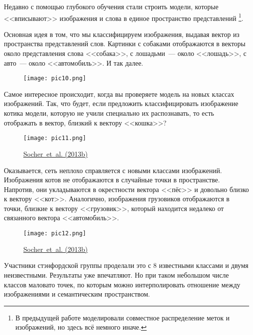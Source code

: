 \documentclass[a4paper,12pt]{article}
\begin{document}
Недавно с помощью глубокого обучения стали строить модели, которые <<вписывают>> изображения и слова в единое пространство представлений \footnote{В предыдущей работе моделировали совместное распределение меток и изображений, но    здесь всё немного иначе.}.

Основная идея в том, что мы классифицируем изображения, выдавая вектор из пространства представлений слов. Картинки с собаками отображаются в векторы около представления слова <<собака>>, с лошадьми~--- около <<лошадь>>, с авто~--- около <<автомобиль>>. И так далее.

\begin{figure}[t]
\begin{center}
\texttt{[image: pic10.png]}
\end{center}
\end{figure}

Самое интересное происходит, когда вы проверяете модель на новых классах изображений. Так, что будет, если предложить классифицировать изображение котика модели, которую не учили специально их распознавать, то есть отображать в вектор, близкий к вектору <<кошка>>?


\begin{figure}[t]
\begin{center}
\texttt{[image: pic11.png]}
\caption{\href{http://nlp.stanford.edu/~socherr/SocherGanjooManningNg_NIPS2013.pdf}{Socher~et~al. (2013b)}}
\end{center}
\end{figure}

Оказывается, сеть неплохо справляется с новыми классами изображений. Изображения котов не отображаются в случайные точки в пространстве. Напротив, они укладываются в окрестности вектора <<пёс>> и довольно близко к вектору <<кот>>. Аналогично, изображения грузовиков отображаются в точки, близкие к вектору <<грузовик>>, который находится недалеко от связанного вектора <<автомобиль>>.

\begin{figure}[t]
\begin{center}
\texttt{[image: pic12.png]}
\caption{\href{http://nlp.stanford.edu/~socherr/SocherGanjooManningNg_NIPS2013.pdf}{Socher~et~al. (2013b)}}
\end{center}
\end{figure}

Участники стэнфордской группы проделали это с 8 известными классами и двумя неизвестными. Результаты уже впечатляют. Но при таком небольшом числе классов маловато точек, по которым можно интерполировать отношение между изображениями и семантическим пространством.
\end{document}
